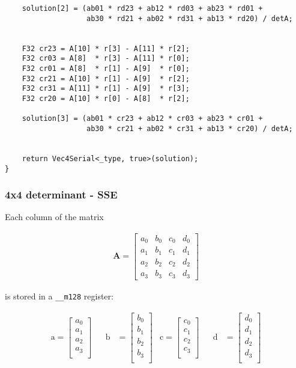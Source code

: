\begin{verbatim}
    solution[2] = (ab01 * rd23 + ab12 * rd03 + ab23 * rd01 + 
                   ab30 * rd21 + ab02 * rd31 + ab13 * rd20) / detA;


    F32 cr23 = A[10] * r[3] - A[11] * r[2];
    F32 cr03 = A[8]  * r[3] - A[11] * r[0];
    F32 cr01 = A[8]  * r[1] - A[9]  * r[0];
    F32 cr21 = A[10] * r[1] - A[9]  * r[2];
    F32 cr31 = A[11] * r[1] - A[9]  * r[3];
    F32 cr20 = A[10] * r[0] - A[8]  * r[2];

    solution[3] = (ab01 * cr23 + ab12 * cr03 + ab23 * cr01 + 
                   ab30 * cr21 + ab02 * cr31 + ab13 * cr20) / detA;


    return Vec4Serial<_type, true>(solution);
}
\end{verbatim}




\newpage
\subsubsection{4x4 determinant - SSE}
\label{sec:determinant4x4SSE}

Each column of the matrix

\begin{align*}
\mathbf{A}
=
\begin{bmatrix}
a_0&b_0&c_0&d_0\\
a_1&b_1&c_1&d_1\\
a_2&b_2&c_2&d_2\\
a_3&b_3&c_3&d_3
\end{bmatrix}
\end{align*}

is stored in a \texttt{__m128} register:

\begin{align*}
\mathrm{a} 
=
\begin{bmatrix}
a_0\\
a_1\\
a_2\\
a_3\\
\end{bmatrix}
&&
\mathrm{b} 
&=
\begin{bmatrix}
b_0\\
b_1\\
b_2\\
b_3\\
\end{bmatrix}
&
\mathrm{c} 
=
\begin{bmatrix}
c_0\\
c_1\\
c_2\\
c_3\\
\end{bmatrix}
&&
\mathrm{d} 
&=
\begin{bmatrix}
d_0\\
d_1\\
d_2\\
d_3\\
\end{bmatrix}
\end{align*}




